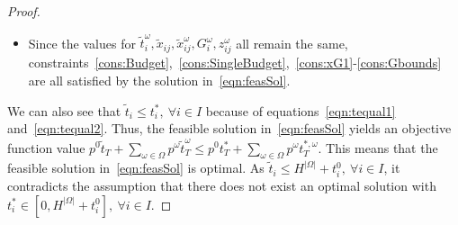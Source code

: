 \documentclass[11pt]{article}
\newcommand{\tcb}{\textcolor{blue}}
\begin{document}
{\begin{proof}
\begin{itemize}
\begin{itemize}
				\end{itemize}
				\item Since the values for \(\tilde{t}_i^\omega, \tilde{x}_{ij}, \tilde{x}_{ij}^\omega, G_i^\omega, z_{ij}^\omega\) all remain the same, constraints~\eqref{cons:Budget},~\eqref{cons:SingleBudget},~\eqref{cons:xG1}-\eqref{cons:Gbounds} are all satisfied by the solution in~\eqref{eqn:feasSol}.
			\end{itemize}
			We can also see that \(\tilde{t}_i \leq t_i^* ,\ \forall i \in I\) because of equations~\eqref{eqn:tequal1} and~\eqref{eqn:tequal2}. Thus, the feasible solution in~\eqref{eqn:feasSol} yields an objective function value \(p^0 \tilde{t}_T + \sum_{\omega \in \Omega} p^\omega \tilde{t}_T^{\omega} \le p^0 t_T^* + \sum_{\omega \in \Omega} p^\omega t_T^{*,\omega}\). This means that the feasible solution in~\eqref{eqn:feasSol} is optimal. As \(\tilde{t}_i \leq H^{|\Omega|} + t_i^0,\ \forall i \in I\), it contradicts the assumption that there does not exist an optimal solution with \(t^*_i \in [0,H^{|\Omega|} + t_i^0],\ \forall i \in I\). 
	\end{proof}}
\end{document}
